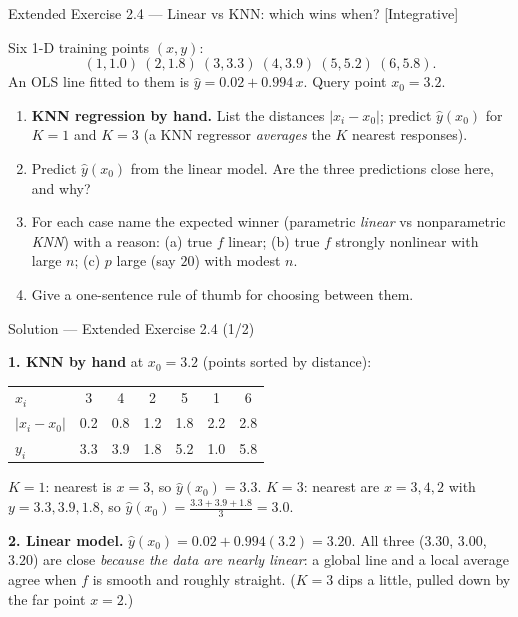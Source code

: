 \documentclass[aspectratio=169,11pt]{beamer}
\begin{document}
\begin{frame}{Extended Exercise 2.4 --- Linear vs KNN: which wins when? [Integrative]}
\begin{longexercise}
Six 1-D training points $(x,y)$:
\[
(1,1.0)\ (2,1.8)\ (3,3.3)\ (4,3.9)\ (5,5.2)\ (6,5.8).
\]
An OLS line fitted to them is $\hat y=0.02+0.994\,x$. Query point $x_0=3.2$.
\begin{enumerate}\setlength\itemsep{1pt}
  \item \textbf{KNN regression by hand.} List the distances $|x_i-x_0|$; predict $\hat y(x_0)$ for $K=1$ and $K=3$ (a KNN regressor \emph{averages} the $K$ nearest responses).
  \item Predict $\hat y(x_0)$ from the linear model. Are the three predictions close here, and why?
  \item For each case name the expected winner (parametric \emph{linear} vs nonparametric \emph{KNN}) with a reason: (a) true $f$ linear; (b) true $f$ strongly nonlinear with large $n$; (c) $p$ large (say $20$) with modest $n$.
  \item Give a one-sentence rule of thumb for choosing between them.
\end{enumerate}
\end{longexercise}
\end{frame}

\begin{frame}{Solution --- Extended Exercise 2.4 (1/2)}
\begin{solutionbox}
\textbf{1. KNN by hand} at $x_0=3.2$ (points sorted by distance):
\begin{center}\footnotesize
\begin{tabular}{lcccccc}
\toprule
$x_i$        & 3   & 4   & 2   & 5   & 1   & 6   \\
$|x_i-x_0|$  & 0.2 & 0.8 & 1.2 & 1.8 & 2.2 & 2.8 \\
$y_i$        & 3.3 & 3.9 & 1.8 & 5.2 & 1.0 & 5.8 \\
\bottomrule
\end{tabular}
\end{center}
$K=1$: nearest is $x=3$, so $\hat y(x_0)=3.3$. \quad
$K=3$: nearest are $x=3,4,2$ with $y=3.3,3.9,1.8$, so $\hat y(x_0)=\tfrac{3.3+3.9+1.8}{3}=3.0$.

\textbf{2. Linear model.} $\hat y(x_0)=0.02+0.994(3.2)=3.20$. All three ($3.30$, $3.00$, $3.20$) are close \emph{because the data are nearly linear}: a global line and a local average agree when $f$ is smooth and roughly straight. ($K=3$ dips a little, pulled down by the far point $x=2$.)
\end{solutionbox}
\end{frame}
\end{document}
